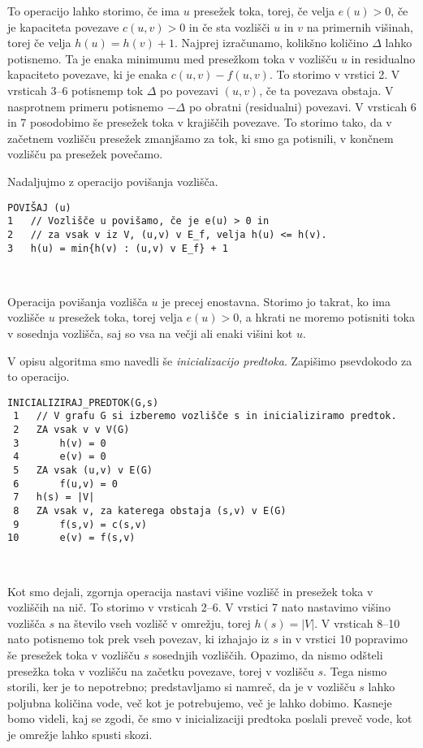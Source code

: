 \documentclass[mat1]{fmfdelo}
\begin{document}
To operacijo lahko storimo, če ima $u$ presežek toka, torej, če velja $e(u) > 0$, če je kapaciteta povezave $c(u,v) > 0$ in če sta vozlišči $u$ in $v$ na primernih višinah, torej če velja $h(u) = h(v) + 1$. Najprej izračunamo, kolikšno količino $\Delta$ lahko potisnemo. Ta je enaka minimumu med presežkom toka v vozlišču $u$ in residualno kapaciteto povezave, ki je enaka $c(u,v) - f(u,v)$. To storimo v vrstici 2. V vrsticah 3--6 potisnemp tok $\Delta$ po povezavi $(u,v)$, če ta povezava obstaja. V nasprotnem primeru potisnemo $-\Delta$ po obratni (residualni) povezavi. V vrsticah 6 in 7 posodobimo še presežek toka v krajiščih povezave. To storimo tako, da v začetnem vozlišču presežek zmanjšamo za tok, ki smo ga potisnili, v končnem vozlišču pa presežek povečamo.

Nadaljujmo z operacijo povišanja vozlišča.\\

\begin{verbatim}
POVIŠAJ (u)
1   // Vozlišče u povišamo, če je e(u) > 0 in
2   // za vsak v iz V, (u,v) v E_f, velja h(u) <= h(v).
3   h(u) = min{h(v) : (u,v) v E_f} + 1
\end{verbatim}~

Operacija povišanja vozlišča $u$ je precej enostavna. Storimo jo takrat, ko ima vozlišče $u$ presežek toka, torej velja $e(u) > 0$, a hkrati ne moremo potisniti toka v sosednja vozlišča, saj so vsa na večji ali enaki višini kot $u$.

V opisu algoritma smo navedli še \textit{inicializacijo predtoka}. Zapišimo psevdokodo za to operacijo.\\

\begin{verbatim}
INICIALIZIRAJ_PREDTOK(G,s)
 1   // V grafu G si izberemo vozlišče s in inicializiramo predtok.
 2   ZA vsak v v V(G)
 3       h(v) = 0
 4       e(v) = 0
 5   ZA vsak (u,v) v E(G)
 6       f(u,v) = 0
 7   h(s) = |V|
 8   ZA vsak v, za katerega obstaja (s,v) v E(G)
 9       f(s,v) = c(s,v)
10       e(v) = f(s,v)
\end{verbatim}~

Kot smo dejali, zgornja operacija nastavi višine vozlišč in presežek toka v vozliščih na nič. To storimo v vrsticah 2--6. V vrstici 7 nato nastavimo višino vozlišča $s$ na število vseh vozlišč v omrežju, torej $h(s) = |V|$. V vrsticah 8--10 nato potisnemo tok prek vseh povezav, ki izhajajo iz $s$ in v vrstici 10 popravimo še presežek toka v vozlišču $s$ sosednjih vozliščih. Opazimo, da nismo odšteli presežka toka v vozlišču na začetku povezave, torej v vozlišču $s$. Tega nismo storili, ker je to nepotrebno; predstavljamo si namreč, da je v vozlišču $s$ lahko poljubna količina vode, več kot je potrebujemo, več je lahko dobimo. Kasneje bomo videli, kaj se zgodi, če smo v inicializaciji predtoka poslali preveč vode, kot je omrežje lahko spusti skozi.
\end{document}
